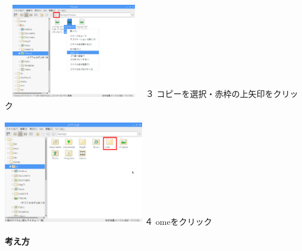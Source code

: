 \documentclass[a4paper,12pt]{jarticle}
\begin{document}
\bigskip

\begin{minipage}{6.413cm}
  \includegraphics[width=6.146cm,height=4.114cm]{textbook-img163.png}
  \newline
  ３
  コピーを選択・赤枠の上矢印をクリック
\end{minipage}
\hspace{10mm}
\begin{minipage}{6.5cm}
  \includegraphics[width=6.1cm,height=4.646cm]{textbook-img165.png}
  \newline
  ４ omeをクリック
\end{minipage}

\clearpage
\flushleft

\textbf{考え方}


\bigskip


\bigskip


\bigskip
\end{document}
